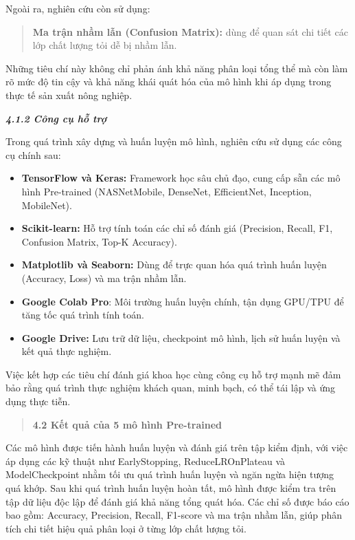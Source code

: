 \documentclass[
]{article}
\begin{document}
Ngoài ra, nghiên cứu còn sử dụng:

\begin{quote}
\textbf{Ma trận nhầm lẫn (Confusion Matrix):} dùng để quan sát chi tiết
các lớp chất lượng tỏi dễ bị nhầm lẫn.
\end{quote}

Những tiêu chí này không chỉ phản ánh khả năng phân loại tổng thể mà còn
làm rõ mức độ tin cậy và khả năng khái quát hóa của mô hình khi áp dụng
trong thực tế sản xuất nông nghiệp.

\protect{}\label{_Toc232112037}{}\emph{\textbf{4.1.2 Công
cụ hỗ trợ}}

Trong quá trình xây dựng và huấn luyện mô hình, nghiên cứu sử dụng các
công cụ chính sau:

\begin{itemize}
\item
  \textbf{TensorFlow và Keras:} Framework học sâu chủ đạo, cung cấp sẵn
  các mô hình Pre-trained (NASNetMobile, DenseNet, EfficientNet,
  Inception, MobileNet).
\item
  \textbf{Scikit-learn:} Hỗ trợ tính toán các chỉ số đánh giá
  (Precision, Recall, F1, Confusion Matrix, Top-K Accuracy).
\item
  \textbf{Matplotlib và Seaborn:} Dùng để trực quan hóa quá trình huấn
  luyện (Accuracy, Loss) và ma trận nhầm lẫn.
\item
  \textbf{Google Colab Pro}: Môi trường huấn luyện chính, tận dụng
  GPU/TPU để tăng tốc quá trình tính toán.
\item
  \textbf{Google Drive:} Lưu trữ dữ liệu, checkpoint mô hình, lịch sử
  huấn luyện và kết quả thực nghiệm.
\end{itemize}

Việc kết hợp các tiêu chí đánh giá khoa học cùng công cụ hỗ trợ mạnh mẽ
đảm bảo rằng quá trình thực nghiệm khách quan, minh bạch, có thể tái lập
và ứng dụng thực tiễn.

\begin{quote}
\protect{}\label{_Toc232112038}{}\textbf{4.2 Kết quả của 5
mô hình Pre-trained}
\end{quote}

Các mô hình được tiến hành huấn luyện và đánh giá trên tập kiểm định,
với việc áp dụng các kỹ thuật như EarlyStopping, ReduceLROnPlateau và
ModelCheckpoint nhằm tối ưu quá trình huấn luyện và ngăn ngừa hiện tượng
quá khớp. Sau khi quá trình huấn luyện hoàn tất, mô hình được kiểm tra
trên tập dữ liệu độc lập để đánh giá khả năng tổng quát hóa. Các chỉ số
được báo cáo bao gồm: Accuracy, Precision, Recall, F1-score và ma trận
nhầm lẫn, giúp phân tích chi tiết hiệu quả phân loại ở từng lớp chất
lượng tỏi.
\end{document}
